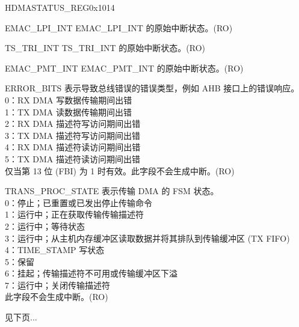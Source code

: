 \begin{register}{H}{DMASTATUS\_REG}{0x1014}\label{regdesc:DMASTATUSREG}
%
%
%
%
%
%
%
%
%
%
%
%
%
%
%
%
%
%
%
%
%
%
%
%
\regnewline%
\begin{regdesc}\begin{reglist}
\item [EMAC\_LPI\_INT] EMAC\_LPI\_INT 的原始中断状态。(RO)
\item [TS\_TRI\_INT] TS\_TRI\_INT 的原始中断状态。(RO)
\item [EMAC\_PMT\_INT] EMAC\_PMT\_INT 的原始中断状态。(RO)

\item [ERROR\_BITS] 表示导致总线错误的错误类型，例如 AHB 接口上的错误响应。\\
0：RX DMA 写数据传输期间出错\\
1：TX DMA 读数据传输期间出错\\
2：RX DMA 描述符写访问期间出错\\
3：TX DMA 描述符写访问期间出错\\
4：RX DMA 描述符读访问期间出错\\
5：TX DMA 描述符读访问期间出错\\
仅当第 13 位 (FBI) 为 1 时有效。此字段不会生成中断。(RO)
\item [TRANS\_PROC\_STATE] 表示传输 DMA 的 FSM 状态。\\
0：停止；已重置或已发出停止传输命令\\
1：运行中；正在获取传输传输描述符\\
2：运行中；等待状态\\
3：运行中；从主机内存缓冲区读取数据并将其排队到传输缓冲区 (TX FIFO)\\
4：TIME\_STAMP 写状态\\
5：保留\\
6：挂起；传输描述符不可用或传输缓冲区下溢\\
7：运行中；关闭传输描述符\\
此字段不会生成中断。(RO)
\item [见下页...]
\end{reglist}\end{regdesc}
\end{register}\addtocounter{Regfloat}{-1}

